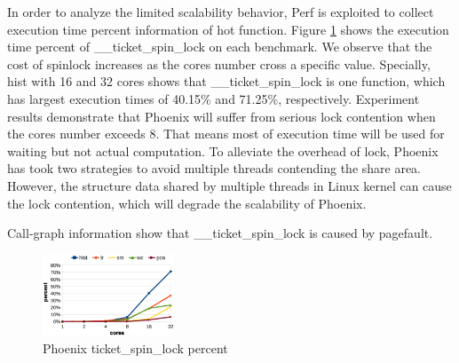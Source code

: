 In order to analyze the limited scalability behavior, 
Perf\cite{} is exploited to collect execution time  percent information of hot function. 
Figure \ref{fig:phoenix:spinlock} shows the execution time percent of \_\_ticket\_spin\_lock on each benchmark. 
We observe that the cost of spinlock increases as the cores number cross a specific value.
Specially, hist with 16 and 32 cores shows that \_\_ticket\_spin\_lock is one function, 
which has largest execution times  of 40.15\%  and 71.25\%, respectively. 
Experiment results demonstrate that Phoenix  will suffer from serious lock contention
when the cores number exceeds 8. 
That means most of execution time will be used for waiting but not actual computation.
To alleviate the overhead of lock, Phoenix has took two strategies to avoid multiple threads contending the share area.
However, the  structure data shared by multiple threads in Linux kernel can cause the lock contention, which 
will degrade the scalability of Phoenix.


Call-graph information show that \_\_ticket\_spin\_lock is caused by pagefault.
\begin{figure}[!h!t]  
    \centering
    \includegraphics[width=0.35\textwidth]{eps/phoenix_spinlock.eps}
    \caption{Phoenix ticket\_spin\_lock percent}
    \label{fig:phoenix:spinlock}
\end{figure}



